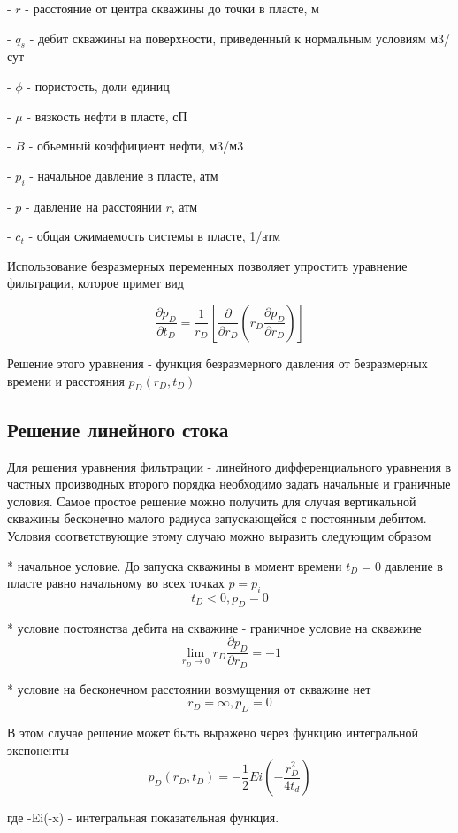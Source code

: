 \documentclass[oneside, openany]{memoir}
\begin{document}
	- $r$ - расстояние от центра скважины до точки в пласте, м
	
	- $q_s$ - дебит скважины на поверхности, приведенный к нормальным условиям м3/сут
	
	- $\phi$ - пористость, доли единиц
	
	- $\mu$ - вязкость нефти в пласте, сП
	
	- $B$ - объемный коэффициент нефти, м3/м3
	
	- $p_i$ - начальное давление в пласте, атм
	
	- $p$ - давление на расстоянии $r$, атм
	
	- $c_t$ - общая сжимаемость системы в пласте, 1/атм
	
	Использование безразмерных переменных позволяет упростить уравнение фильтрации, которое примет вид
	
	$$ 
	\frac{\partial p_D}{ \partial t_D} = \dfrac{1}{r_D} \left[ \dfrac{\partial}{\partial r_D} \left( r_D \dfrac{ \partial p_D} {\partial r_D} \right) \right] 
	$$
	
	Решение этого уравнения - функция безразмерного давления от безразмерных времени и расстояния $p_D(r_D, t_D) $
	
	\subsection{Решение линейного стока} 
	
	Для решения уравнения фильтрации - линейного дифференциального уравнения в частных производных второго порядка необходимо задать начальные и граничные условия.
	Самое простое решение можно получить для случая вертикальной скважины бесконечно малого радиуса запускающейся с постоянным дебитом. Условия соответствующие этому случаю можно выразить следующим образом
	
	* начальное условие. До запуска скважины в момент времени  $t_D = 0$ давление в пласте равно начальному во всех точках $p=p_i$
	$$ t_D < 0, p_D = 0$$
	
	* условие постоянства дебита на скважине - граничное условие на скважине
	$$ \lim_{r_D \to 0} {r_D \frac{\partial p_D}{\partial r_D}} = -1 $$
	
	* условие на бесконечном расстоянии возмущения от скважине нет
	$$ r_D = \infty, p_D = 0 $$
	
	В этом случае решение может быть выражено через функцию интегральной экспоненты
	$$ p_D(r_D,t_D) = - \frac{1}{2} Ei \left(- \dfrac{ r_D^2}{4t_d} \right) $$
	
	где -Ei(-x) - интегральная показательная функция.
	
\end{document}
